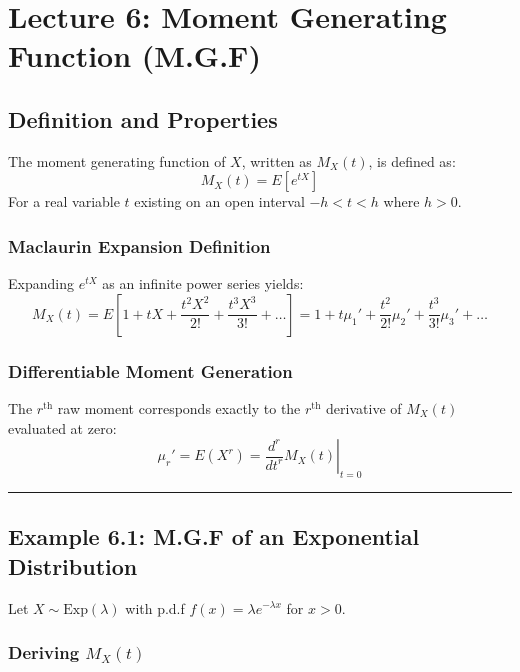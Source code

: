 \documentclass[
]{article}
\begin{document}
\section{Lecture 6: Moment Generating Function
(M.G.F)}\label{lecture-6-moment-generating-function-m.g.f}

\subsection{Definition and Properties}\label{definition-and-properties}

The moment generating function of \(X\), written as \(M_X(t)\), is
defined as: \[M_X(t) = E[e^{tX}]\] For a real variable \(t\) existing on
an open interval \(-h < t < h\) where \(h > 0\).

\subsubsection{Maclaurin Expansion
Definition}\label{maclaurin-expansion-definition}

Expanding \(e^{tX}\) as an infinite power series yields:
\[M_X(t) = E\left[ 1 + tX + \frac{t^2X^2}{2!} + \frac{t^3X^3}{3!} + \dots \right] = 1 + t\mu_1' + \frac{t^2}{2!}\mu_2' + \frac{t^3}{3!}\mu_3' + \dots\]

\subsubsection{Differentiable Moment
Generation}\label{differentiable-moment-generation}

The \(r^{\text{th}}\) raw moment corresponds exactly to the
\(r^{\text{th}}\) derivative of \(M_X(t)\) evaluated at zero:
\[\mu_r' = E(X^r) = \left. \frac{d^r}{dt^r} M_X(t) \right|_{t=0}\]

\begin{center}\rule{0.5\linewidth}{0.5pt}\end{center}

\subsection{Example 6.1: M.G.F of an Exponential
Distribution}\label{example-6.1-m.g.f-of-an-exponential-distribution}

Let \(X \sim \text{Exp}(\lambda)\) with p.d.f
\(f(x) = \lambda e^{-\lambda x}\) for \(x > 0\).

\subsubsection{\texorpdfstring{Deriving
\(M_X(t)\)}{Deriving M\_X(t)}}\label{deriving-m_xt}
\end{document}
